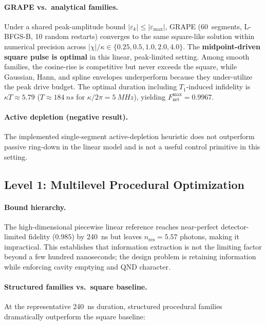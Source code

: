 \documentclass[aps,pra,twocolumn,reprint,amsmath,amssymb]{revtex4-2}
\begin{document}
\paragraph{GRAPE vs.\ analytical families.}
Under a shared peak-amplitude bound $|\varepsilon_k| \le |\varepsilon_\mathrm{max}|$, GRAPE (60~segments, L-BFGS-B, 10 random restarts) converges to the same square-like solution within numerical precision across $|\chi|/\kappa \in \{0.25, 0.5, 1.0, 2.0, 4.0\}$. The \textbf{midpoint-driven square pulse is optimal} in this linear, peak-limited setting. Among smooth families, the cosine-rise is competitive but never exceeds the square, while Gaussian, Hann, and spline envelopes underperform because they under-utilize the peak drive budget. The optimal duration including $T_1$-induced infidelity is $\kappa T \approx 5.79$ ($T\approx\SI{184}{ns}$ for $\kappa/2\pi=\SI{5}{MHz}$), yielding $F_\mathrm{net}^\mathrm{max}=0.9967$.

\paragraph{Active depletion (negative result).}
The implemented single-segment active-depletion heuristic does not outperform passive ring-down in the linear model and is not a useful control primitive in this setting.

\subsection{Level 1: Multilevel Procedural Optimization}
\label{sec:procedural}

\paragraph{Bound hierarchy.}
The high-dimensional piecewise linear reference reaches near-perfect detector-limited fidelity ($0.985$) by \SI{240}{ns} but leaves $n_\mathrm{res}=5.57$ photons, making it impractical. This establishes that information extraction is not the limiting factor beyond a few hundred nanoseconds; the design problem is retaining information while enforcing cavity emptying and QND character.

\paragraph{Structured families vs.\ square baseline.}
At the representative \SI{240}{ns} duration, structured procedural families dramatically outperform the square baseline:
\end{document}
